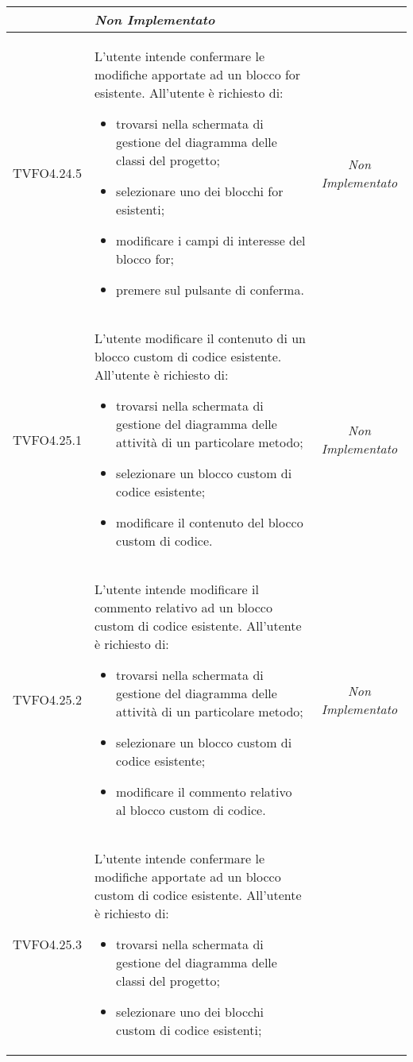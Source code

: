 \begin{longtable}{|c|>{}m{8cm}|c|}
\begin{itemize}
\end{itemize} & \textit{Non Implementato}\\ \hline
\hypertarget{TVFO4.24.5}{TVFO4.24.5} & L'utente intende confermare le modifiche apportate ad un blocco for esistente.
All'utente è richiesto di:
\begin{itemize}
\item trovarsi nella schermata di gestione del diagramma delle classi del progetto;
\item selezionare uno dei blocchi for esistenti;
\item modificare i campi di interesse del blocco for;
\item premere sul pulsante di conferma.
\end{itemize} & \textit{Non Implementato}\\ \hline
\hypertarget{TVFO4.25.1}{TVFO4.25.1} & L'utente modificare il contenuto di un blocco custom di codice esistente.
All'utente è richiesto di:
\begin{itemize}
\item trovarsi nella schermata di gestione del diagramma delle attività di un particolare metodo;
\item selezionare un blocco custom di codice esistente;
\item modificare il contenuto del blocco custom di codice.
\end{itemize} & \textit{Non Implementato}\\ \hline
\hypertarget{TVFO4.25.2}{TVFO4.25.2} & L'utente intende modificare il commento relativo ad un blocco custom di codice esistente.
All'utente è richiesto di:
\begin{itemize}
\item trovarsi nella schermata di gestione del diagramma delle attività di un particolare metodo;
\item selezionare un blocco custom di codice esistente;
\item modificare il commento relativo al blocco custom di codice.
\end{itemize} & \textit{Non Implementato}\\ \hline
\hypertarget{TVFO4.25.3}{TVFO4.25.3} & L'utente intende confermare le modifiche apportate ad un blocco custom di codice esistente.
All'utente è richiesto di:
\begin{itemize}
\item trovarsi nella schermata di gestione del diagramma delle classi del progetto;
\item selezionare uno dei blocchi custom di codice esistenti;

\end{itemize}
\end{longtable}
